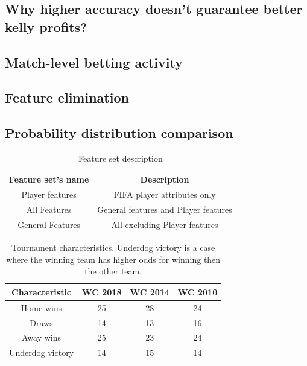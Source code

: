 \subsection{Why higher accuracy doesn't guarantee better kelly profits?}
\subsection{Match-level betting activity}
\subsection{Feature elimination}
\subsection{Probability distribution comparison}
\begin{table}
    \caption{Feature set description}
    \begin{tabular}{| c | c|}
        \hline
        Feature set's name & Description \\
        \hline
        Player features & FIFA player attributes only \\
        All Features & General features and Player features \\
        General Features & All excluding Player features \\
        \hline
    \end{tabular}
    \label{table:featuresetlist}
\end{table}

\begin{table}
    \caption{Tournament characteristics. Underdog victory is a case where the winning team has higher odds for winning then the other team.}
    \begin{tabular}{| c | c|c | c|}
        \hline
        Characteristic & \textbf{WC 2018} & \textbf{WC 2014} & \textbf{WC 2010}\\
        \hline
        Home wins & 25 & 28 & 24\\
        Draws & 14 & 13 & 16\\
        Away wins & 25 & 23 & 24\\
        Underdog victory  & 14 & 15 & 14\\
        \hline
    \end{tabular}
    \label{table:tournamentcharacteristics}
\end{table}


